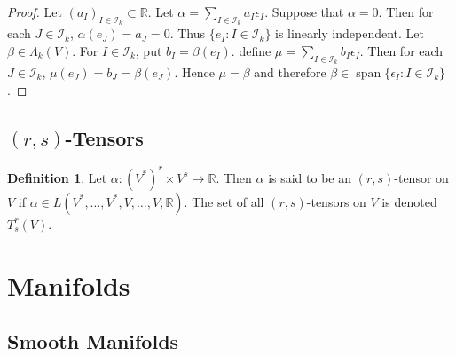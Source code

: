 \documentclass[12pt]{amsart}
\theoremstyle{definition}
\newtheorem{defn}[definition]{Definition}
\theoremstyle{remark}
\theoremstyle{definition}
\newcommand{\al}{\alpha}
\newcommand{\bet}{\beta}
\newcommand{\Lam}{\Lambda}
\newcommand{\ep}{\epsilon}
\newcommand{\R}{\mathbb{R}}
\newcommand{\MI}{\mathcal{I}}
\DeclareMathOperator{\spn}{span}
\begin{document}
	\begin{proof}
		Let $(a_I)_{I \in \MI_k} \subset \R$. Let $\al = \sum_{I \in \MI_k}a_I \ep_I$. Suppose that $\al = 0$. Then for each $J \in \MI_k$, $\al(e_J) = a_J = 0$. Thus $\{e_I: I \in \MI_k\}$ is linearly independent. Let $\bet \in \Lam_k(V)$. For $I \in \MI_k$, put $b_I = \bet(e_I)$. define $\mu = \sum_{I \in \MI_k} b_I\ep_I$. Then for each $J \in \MI_k$, $\mu(e_J) = b_J = \bet(e_J)$. Hence $\mu = \bet$ and therefore $\bet \in \spn \{\ep_I:I \in \MI_k\}$.
	\end{proof}
	
	
	
	
	
	
	
	
	
	
	
	
	
	
	
	\newpage
	
	\subsection{$(r,s)$-Tensors}
	
	\begin{defn}
	Let $\al: (V^*)^r \times V^s \rightarrow \R$. Then $\al$ is said to be an $(r,s)$-tensor on $V$ if $\al \in L(V^*, \dots, V^*, V, \dots, V; \R)$. The set of all $(r,s)$-tensors on $V$ is denoted $T^r_s(V)$.
	\end{defn}
	
	
	
	
	
	
	
	
	
	
	
	
	
	
	
	
	
	
	
	
	
	
	
	
	
	
	
	
	

	\newpage
	
	\section{Manifolds}
	
	\subsection{Smooth Manifolds}
	
\end{document}
